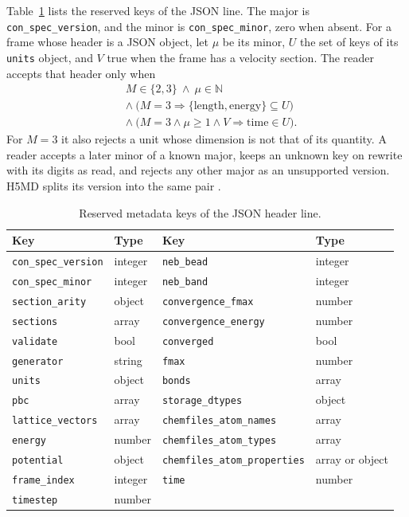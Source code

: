 \documentclass[preprint,12pt]{elsarticle}
\begin{document}
Table~\ref{tab:keys} lists the reserved keys of the JSON line.
The major is \texttt{con\_spec\_version}, and the minor is
\texttt{con\_spec\_minor}, zero when absent.
For a frame whose header is a JSON object, let \(\mu\) be its minor,
\(U\) the set of keys of its \texttt{units} object, and \(V\) true when
the frame has a velocity section.
The reader accepts that header only when
\begin{equation}
\label{eq:version}
\begin{aligned}
&M\in\{2,3\}\ \wedge\ \mu\in\mathbb{N}\\
&\wedge\ \bigl(M=3\Rightarrow\{\mathrm{length},\mathrm{energy}\}\subseteq U\bigr)\\
&\wedge\ \bigl(M=3\wedge\mu\ge1\wedge V\Rightarrow \mathrm{time}\in U\bigr).
\end{aligned}
\end{equation}
For \(M=3\) it also rejects a unit whose dimension is not that of its
quantity.
A reader accepts a later minor of a known major, keeps an unknown key on
rewrite with its digits as read, and rejects any other major as an
unsupported version.
H5MD splits its version into the same pair
\cite{buylH5mdStructuredEfficient2014}.

\begin{table}[tbp] \centering \footnotesize
\caption{Reserved metadata keys of the JSON header line.}
\label{tab:keys}
\begin{tabular}{ll@{\hspace{1.4em}}ll}
\toprule
Key & Type & Key & Type \\
\midrule
\texttt{con\_spec\_version} & integer & \texttt{neb\_bead} & integer \\
\texttt{con\_spec\_minor} & integer & \texttt{neb\_band} & integer \\
\texttt{section\_arity} & object & \texttt{convergence\_fmax} & number \\
\texttt{sections} & array & \texttt{convergence\_energy} & number \\
\texttt{validate} & bool & \texttt{converged} & bool \\
\texttt{generator} & string & \texttt{fmax} & number \\
\texttt{units} & object & \texttt{bonds} & array \\
\texttt{pbc} & array & \texttt{storage\_dtypes} & object \\
\texttt{lattice\_vectors} & array & \texttt{chemfiles\_atom\_names} & array \\
\texttt{energy} & number & \texttt{chemfiles\_atom\_types} & array \\
\texttt{potential} & object & \texttt{chemfiles\_atom\_properties} & array or object \\
\texttt{frame\_index} & integer & \texttt{time} & number \\
\texttt{timestep} & number & & \\
\bottomrule
\end{tabular}
\end{table}
\end{document}
